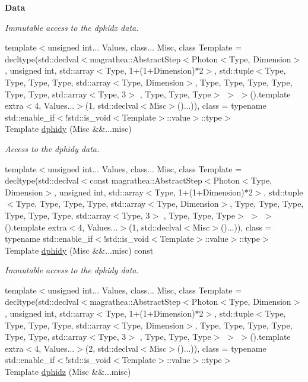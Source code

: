 \begin{Indent}{\bf Data}
\begin{DoxyCompactItemize}
\begin{DoxyCompactList}\small\item\em Immutable access to the dphidx data. \end{DoxyCompactList}\item 
{\footnotesize template$<$unsigned int... Values, class... Misc, class Template  = decltype(std\-::declval$<$magrathea\-::\-Abstract\-Step$<$\-Photon$<$\-Type, Dimension$>$, unsigned int, std\-::array$<$\-Type, 1+(1+\-Dimension)$\ast$2$>$, std\-::tuple$<$\-Type, Type, Type, Type, std\-::array$<$\-Type, Dimension$>$, Type, Type, Type, Type, Type, Type, std\-::array$<$\-Type, 3$>$ , Type, Type, Type$>$ $>$ $>$().\-template extra$<$4, Values...$>$(1, std\-::declval$<$\-Misc$>$()...)), class  = typename std\-::enable\-\_\-if$<$!std\-::is\-\_\-void$<$\-Template$>$\-::value$>$\-::type$>$ }\\Template \hyperlink{exceptionPhoton_a464c19e2d668c12af6f36d0fd17cffd8}{dphidy} (Misc \&\&...misc)
\begin{DoxyCompactList}\small\item\em Access to the dphidy data. \end{DoxyCompactList}\item 
{\footnotesize template$<$unsigned int... Values, class... Misc, class Template  = decltype(std\-::declval$<$const magrathea\-::\-Abstract\-Step$<$\-Photon$<$\-Type, Dimension$>$, unsigned int, std\-::array$<$\-Type, 1+(1+\-Dimension)$\ast$2$>$, std\-::tuple$<$\-Type, Type, Type, Type, std\-::array$<$\-Type, Dimension$>$, Type, Type, Type, Type, Type, Type, std\-::array$<$\-Type, 3$>$ , Type, Type, Type$>$ $>$ $>$().\-template extra$<$4, Values...$>$(1, std\-::declval$<$\-Misc$>$()...)), class  = typename std\-::enable\-\_\-if$<$!std\-::is\-\_\-void$<$\-Template$>$\-::value$>$\-::type$>$ }\\Template \hyperlink{exceptionPhoton_a5fb3d8080d25a043954544bc577ab947}{dphidy} (Misc \&\&...misc) const 
\begin{DoxyCompactList}\small\item\em Immutable access to the dphidy data. \end{DoxyCompactList}\item 
{\footnotesize template$<$unsigned int... Values, class... Misc, class Template  = decltype(std\-::declval$<$magrathea\-::\-Abstract\-Step$<$\-Photon$<$\-Type, Dimension$>$, unsigned int, std\-::array$<$\-Type, 1+(1+\-Dimension)$\ast$2$>$, std\-::tuple$<$\-Type, Type, Type, Type, std\-::array$<$\-Type, Dimension$>$, Type, Type, Type, Type, Type, Type, std\-::array$<$\-Type, 3$>$ , Type, Type, Type$>$ $>$ $>$().\-template extra$<$4, Values...$>$(2, std\-::declval$<$\-Misc$>$()...)), class  = typename std\-::enable\-\_\-if$<$!std\-::is\-\_\-void$<$\-Template$>$\-::value$>$\-::type$>$ }\\Template \hyperlink{exceptionPhoton_a153636f087f1d7a5f8712dc806b17b92}{dphidz} (Misc \&\&...misc)

\end{DoxyCompactItemize}
\end{Indent}

